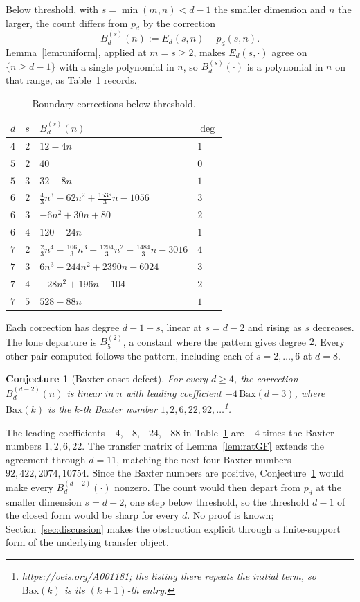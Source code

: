 \documentclass[11pt]{article}
\newtheorem{conjecture}[theorem]{Conjecture}
\theoremstyle{definition}
\theoremstyle{remark}
\begin{document}
Below threshold, with $s=\min(m,n)<d-1$ the smaller dimension and $n$ the
larger, the count differs from $p_d$ by the correction
\[
  B_d^{(s)}(n) := E_d(s,n) - p_d(s,n).
\]
Lemma~\ref{lem:uniform}, applied at $m=s\ge2$, makes $E_d(s,\cdot)$ agree on
$\{n\ge d-1\}$ with a single polynomial in $n$, so $B_d^{(s)}(\cdot)$ is a
polynomial in $n$ on that range, as Table~\ref{tab:corr} records.
\begin{table}[!ht]
\centering
\begin{tabular}{@{}llll@{}}
\toprule
$d$ & $s$ & $B_d^{(s)}(n)$ & $\deg$\\
\midrule
$4$ & $2$ & $12-4n$ & $1$\\
$5$ & $2$ & $40$ & $0$\\
$5$ & $3$ & $32-8n$ & $1$\\
$6$ & $2$ & $\tfrac43n^3-62n^2+\tfrac{1538}{3}n-1056$ & $3$\\
$6$ & $3$ & $-6n^2+30n+80$ & $2$\\
$6$ & $4$ & $120-24n$ & $1$\\
$7$ & $2$ & $\tfrac23n^4-\tfrac{106}{3}n^3+\tfrac{1204}{3}n^2
            -\tfrac{1484}{3}n-3016$ & $4$\\
$7$ & $3$ & $6n^3-244n^2+2390n-6024$ & $3$\\
$7$ & $4$ & $-28n^2+196n+104$ & $2$\\
$7$ & $5$ & $528-88n$ & $1$\\
\bottomrule
\end{tabular}
\caption{Boundary corrections below threshold.}
\label{tab:corr}
\end{table}
Each correction has degree $d-1-s$, linear at $s=d-2$ and rising as $s$
decreases. The lone departure is $B_5^{(2)}$, a constant where the pattern gives
degree $2$. Every other pair computed follows the pattern, including each of
$s=2,\dots,6$ at $d=8$.

\begin{conjecture}[Baxter onset defect]\label{conj:baxter}
For every $d\ge4$, the correction $B_d^{(d-2)}(n)$ is linear in $n$
with leading coefficient $-4\,\mathrm{Bax}(d-3)$, where $\mathrm{Bax}(k)$ is the
$k$-th Baxter number $1,2,6,22,92,\dots$\footnote{\url{https://oeis.org/A001181}; the
listing there repeats the initial term, so $\mathrm{Bax}(k)$ is its $(k{+}1)$-th entry.}.
\end{conjecture}

The leading coefficients $-4,-8,-24,-88$ in Table~\ref{tab:corr} are $-4$ times
the Baxter numbers $1,2,6,22$. The transfer matrix of Lemma~\ref{lem:ratGF}
extends the agreement through $d=11$, matching the next four Baxter numbers
$92,422,2074,10754$. Since the Baxter numbers are positive,
Conjecture~\ref{conj:baxter} would make every $B_d^{(d-2)}(\cdot)$ nonzero. The count
would then depart from $p_d$ at the smaller dimension $s=d-2$, one step below
threshold, so the threshold $d-1$ of the closed form would be sharp for every $d$. No proof is known; Section~\ref{sec:discussion} makes the obstruction explicit through
a finite-support form of the underlying transfer object.
\end{document}
